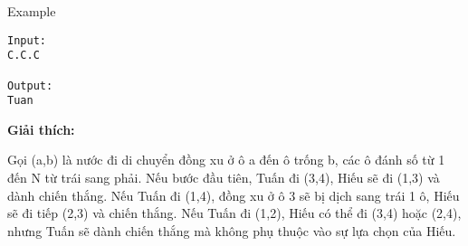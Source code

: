 Example
\begin{verbatim}
Input:
C.C.C

Output:
Tuan

\end{verbatim}

\textbf{Giải thích:}

Gọi (a,b) là nước đi di chuyển đồng xu ở ô a đến ô trống b, các ô đánh số từ 1 đến N từ trái sang phải. Nếu bước đầu tiên, Tuấn đi (3,4), Hiếu sẽ đi (1,3) và dành chiến thắng. Nếu Tuấn đi (1,4), đồng xu ở ô 3 sẽ bị dịch sang trái 1 ô, Hiếu sẽ đi tiếp (2,3) và chiến thắng. Nếu Tuấn đi (1,2), Hiếu có thể đi (3,4) hoặc (2,4), nhưng Tuấn sẽ dành chiến thắng mà không phụ thuộc vào sự lựa chọn của Hiếu.